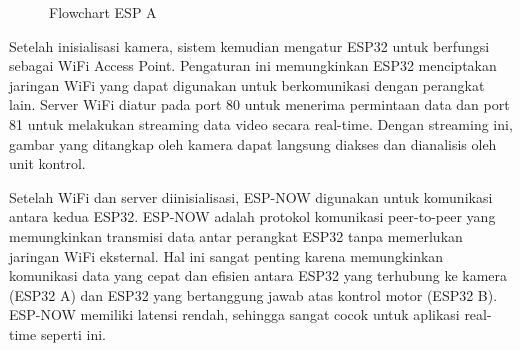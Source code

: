 \begin{figure}[H]
  \centering
  \caption{Flowchart ESP A}
\end{figure}

Setelah inisialisasi kamera, sistem kemudian mengatur ESP32 untuk berfungsi sebagai WiFi Access Point. Pengaturan ini memungkinkan ESP32 menciptakan jaringan WiFi yang dapat digunakan untuk berkomunikasi dengan perangkat lain. Server WiFi diatur pada port 80 untuk menerima permintaan data dan port 81 untuk melakukan streaming data video secara real-time. Dengan streaming ini, gambar yang ditangkap oleh kamera dapat langsung diakses dan dianalisis oleh unit kontrol.

Setelah WiFi dan server diinisialisasi, ESP-NOW digunakan untuk komunikasi antara kedua ESP32. ESP-NOW adalah protokol komunikasi peer-to-peer yang memungkinkan transmisi data antar perangkat ESP32 tanpa memerlukan jaringan WiFi eksternal. Hal ini sangat penting karena memungkinkan komunikasi data yang cepat dan efisien antara ESP32 yang terhubung ke kamera (ESP32 A) dan ESP32 yang bertanggung jawab atas kontrol motor (ESP32 B). ESP-NOW memiliki latensi rendah, sehingga sangat cocok untuk aplikasi real-time seperti ini.

